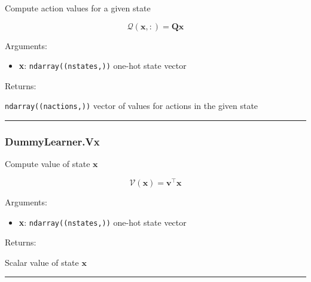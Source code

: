 \begin{Shaded}
\begin{Highlighting}[]
\end{Highlighting}
\end{Shaded}

Compute action values for a given state

\[
\mathcal Q(\mathbf x, :) = \mathbf Q \mathbf x
\]

Arguments:

\begin{itemize}
\tightlist
\item
  \textbf{x}: \texttt{ndarray((nstates,))} one-hot state vector
\end{itemize}

Returns:

\texttt{ndarray((nactions,))} vector of values for actions in the given
state

\begin{center}\rule{0.5\linewidth}{\linethickness}\end{center}

\subsubsection{DummyLearner.Vx}\label{dummylearner.vx}

\begin{Shaded}
\begin{Highlighting}[]
\end{Highlighting}
\end{Shaded}

Compute value of state \(\mathbf x\)

\[
\mathcal V(\mathbf x) = \mathbf v^\top \mathbf x
\]

Arguments:

\begin{itemize}
\tightlist
\item
  \textbf{x}: \texttt{ndarray((nstates,))} one-hot state vector
\end{itemize}

Returns:

Scalar value of state \(\mathbf x\)

\begin{center}\rule{0.5\linewidth}{\linethickness}\end{center}

